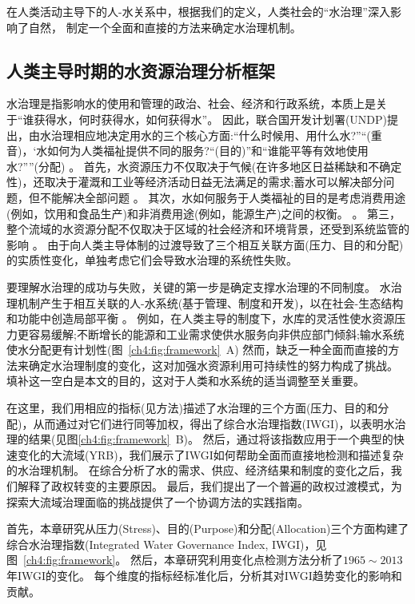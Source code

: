在人类活动主导下的人-水关系中，根据我们的定义，人类社会的“水治理”深入影响了自然，
制定一个全面和直接的方法来确定水治理机制。

\subsection{人类主导时期的水资源治理分析框架}

水治理是指影响水的使用和管理的政治、社会、经济和行政系统，本质上是关于“谁获得水，何时获得水，如何获得水”。
因此，联合国开发计划署(UNDP)提出，由水治理相应地决定用水的三个核心方面:“什么时候用、用什么水?”“(重音)，‘水如何为人类福祉提供不同的服务?“(目的)”和“谁能平等有效地使用水?””(分配)
\cite{undpwatergovernancefacility2016}。
首先，水资源压力不仅取决于气候(在许多地区日益稀缺和不确定性)，还取决于灌溉和工业等经济活动日益无法满足的需求;蓄水可以解决部分问题，但不能解决全部问题
\cite{qin2019,wada2014,huang2021}。
其次，水如何服务于人类福祉的目的是考虑消费用途(例如，饮用和食品生产)和非消费用途(例如，能源生产)之间的权衡。
\cite{liu2017,florke2018,jaeger2019}。
第三，整个流域的水资源分配不仅取决于区域的社会经济和环境背景，还受到系统监管的影响
\cite{schmandt2021,speed2013}。
由于向人类主导体制的过渡导致了三个相互关联方面(压力、目的和分配)的实质性变化，单独考虑它们会导致水治理的系统性失败。

要理解水治理的成功与失败，关键的第一步是确定支撑水治理的不同制度。
水治理机制产生于相互关联的人-水系统(基于管理、制度和开发)，以在社会-生态结构和功能中创造局部平衡
\cite{falkenmark2021,bressers2013,loch2020}。
例如，在人类主导的制度下，水库的灵活性使水资源压力更容易缓解;不断增长的能源和工业需求使供水服务向非供应部门倾斜;输水系统使水分配更有计划性(图~\ref{ch4:fig:framework}~A)
然而，缺乏一种全面而直接的方法来确定水治理制度的变化，这对加强水资源利用可持续性的努力构成了挑战。
填补这一空白是本文的目的，这对于人类和水系统的适当调整至关重要。

在这里，我们用相应的指标(见方法)描述了水治理的三个方面(压力、目的和分配)，从而通过对它们进行同等加权，得出了综合水治理指数(IWGI)，以表明水治理的结果(见图\ref{ch4:fig:framework}~B)。
然后，通过将该指数应用于一个典型的快速变化的大流域(YRB)，我们展示了IWGI如何帮助全面而直接地检测和描述复杂的水治理机制。
在综合分析了水的需求、供应、经济结果和制度的变化之后，我们解释了政权转变的主要原因。
最后，我们提出了一个普遍的政权过渡模式，为探索大流域治理面临的挑战提供了一个协调方法的实践指南。


首先，本章研究从压力(Stress)、目的(Purpose)和分配(Allocation)三个方面构建了综合水治理指数(Integrated Water Governance Index, IWGI)，见图~\ref{ch4:fig:framework}。
然后，本章研究利用变化点检测方法分析了$1965\sim2013$年IWGI的变化。
每个维度的指标经标准化后，分析其对IWGI趋势变化的影响和贡献。


